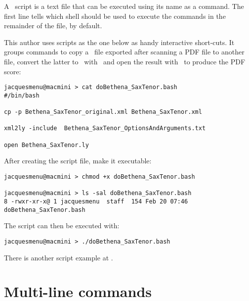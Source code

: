 A \shell\ script is a text file that can be executed using its name as a command. The first line tells which shell should be used to execute the commands in the remainder of the file,  by default.

This author uses scripts as the one below as handy interactive short-cuts. It groups commands to copy a \mxml\ file exported after scanning a PDF file to another file, convert the latter to \lily\ with \xmlToLy\ and open the result with \fresco\ to produce the PDF score:
\begin{lstlisting}[language=Terminal]
jacquesmenu@macmini > cat doBethena_SaxTenor.bash
#/bin/bash

cp -p Bethena_SaxTenor_original.xml Bethena_SaxTenor.xml

xml2ly -include  Bethena_SaxTenor_OptionsAndArguments.txt

open Bethena_SaxTenor.ly
\end{lstlisting}

After creating the script file, make it executable:
\begin{lstlisting}[language=Terminal]
jacquesmenu@macmini > chmod +x doBethena_SaxTenor.bash

jacquesmenu@macmini > ls -sal doBethena_SaxTenor.bash
8 -rwxr-xr-x@ 1 jacquesmenu  staff  154 Feb 20 07:46 doBethena_SaxTenor.bash
\end{lstlisting}

The script can then be executed with:
\begin{lstlisting}[language=Terminal]
jacquesmenu@macmini > ./doBethena_SaxTenor.bash
\end{lstlisting}

There is another script example at .


\section{Multi-line commands}\label{Multi-line commands}

